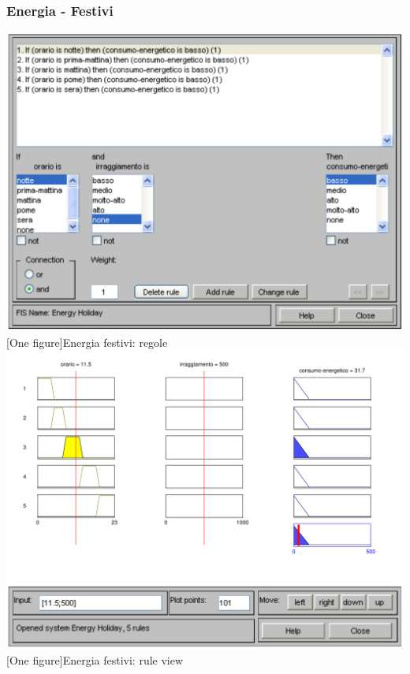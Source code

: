 \subsubsection{Energia - Festivi}
\vspace{20px}
\includegraphics[scale=0.5]{images/fuzzy/energia_festivi_regole.pdf}
[One figure]{Energia festivi: regole}
\vspace{20px}
\includegraphics[scale=0.5]{images/fuzzy/energia_festivi_rule_view.pdf}
[One figure]{Energia festivi: rule view}
\vspace{20px}
